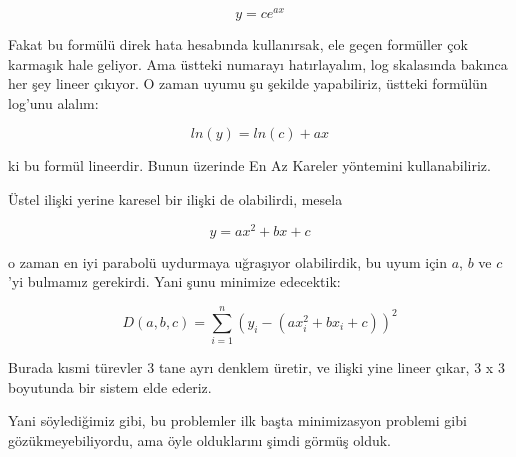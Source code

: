 \documentclass[12pt,fleqn]{article}\usepackage{../../common}
\begin{document}
$$ y = ce^{ax} $$

Fakat bu formülü direk hata hesabında kullanırsak, ele geçen formüller çok
karmaşık hale geliyor. Ama üstteki numarayı hatırlayalım, log skalasında bakınca
her şey lineer çıkıyor. O zaman uyumu şu şekilde yapabiliriz, üstteki formülün
log'unu alalım:

$$ ln(y) = ln(c) + ax $$

ki bu formül lineerdir. Bunun üzerinde En Az Kareler yöntemini
kullanabiliriz. 

Üstel ilişki yerine karesel bir ilişki de olabilirdi, mesela

$$ y = ax^2 + bx + c $$

o zaman en iyi parabolü uydurmaya uğraşıyor olabilirdik, bu uyum için $a$,
$b$ ve $c$'yi bulmamız gerekirdi. Yani şunu minimize edecektik:

$$ D(a,b,c) = \sum_{i=1}^n (y_i - ( ax_i^2 + bx_i + c ))^2  $$

Burada kısmi türevler 3 tane ayrı denklem üretir, ve ilişki yine lineer
çıkar, 3 x 3 boyutunda bir sistem elde ederiz. 

Yani söylediğimiz gibi, bu problemler ilk başta minimizasyon problemi gibi
gözükmeyebiliyordu, ama öyle olduklarını şimdi görmüş olduk. 
\end{document}
